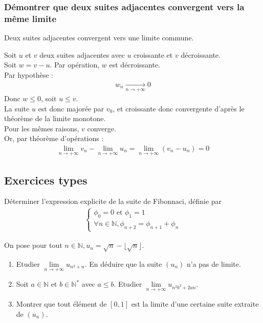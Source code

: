 \documentclass[titlepage, twoside]{report}
\begin{document}
\subsubsection{Démontrer que deux suites adjacentes convergent vers la même limite}
\begin{tcolorbox}[title=Théorème 14.55, title filled=false, colframe=orange, colback=orange!10!white]
    Deux suites adjacentes convergent vers une limite commune. 
\end{tcolorbox}

Soit $u$ et $v$ deux suites adjacentes avec $u$ croissante et $v$ décroissante. \\
Soit $w = v - u$. Par opération, $w$ est décroissante. \\
Par hypothèse : 
\begin{align*}
    w_n \underset{n \to +\infty}{\longrightarrow} 0
\end{align*}
Donc $w \leq 0$, soit $u \leq v$. \\
La suite $u$ est donc majorée par $v_0$, et croissante donc convergente d'après le théorème de la limite monotone. \\
Pour les mêmes raisons, $v$ converge. \\
Or, par théorème d'opérations : 
\begin{align*}
    \lim_{n\to +\infty} v_n - \lim_{n\to +\infty} u_n = \lim_{n\to +\infty} (v_n - u_n) = 0
\end{align*}


\subsection{Exercices types}
\begin{tcolorbox}[title=Exercice 1, title filled=false, colframe=darkgreen, colback=darkgreen!10!white]
    Déterminer l'expression explicite de la suite de Fibonnaci, définie par
    \begin{align*}
        \begin{cases}
            \phi_0 = 0 \text{ et } \phi_1 = 1 \\
            \forall n \in \mathbb{N}, \phi_{n+2} = \phi_{n+1} + \phi_n
        \end{cases}
    \end{align*}
\end{tcolorbox}

\begin{tcolorbox}[title=Exercice 2, title filled=false, colframe=darkgreen, colback=darkgreen!10!white]
    On pose pour tout $n \in \mathbb{N}, u_n = \sqrt{n} - \lfloor \sqrt{n} \rfloor$.
    \begin{enumerate}
        \item Etudier $\lim\limits_{n\to + \infty} u_{n^2 + n}$. En déduire que la suite $(u_n)$ n'a pas de limite. 
        \item Soit $a \in \mathbb{N}$ et $b \in \mathbb{N}^*$ avec $a \leq b$. Etudier $\lim\limits_{n\to +\infty} u_{n^2b^2 + 2an}$. 
        \item Montrer que tout élément de $[0, 1]$ est la limite d'une certaine suite extraite de $(u_n)$. 
    \end{enumerate}
\end{tcolorbox}
\end{document}
